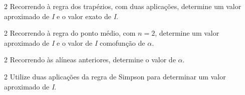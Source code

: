 \documentclass["CN_A-Exercises_Resolutions.tex"]{subfiles}
\begin{document}
\begin{questionBox}2{ %
    Recorrendo à regra dos trapézios, com duas aplicações, determine um valor aproximado de \textit{I} e o valor exato de \textit{I}.
  } %
\end{questionBox}
\begin{questionBox}2{ %
    Recorrendo à regra do ponto médio, com \(n = 2\), determine um valor aproximado de \textit{I} e o valor de \textit{I} comofunção de \(\alpha\).
  } %
\end{questionBox}
\begin{questionBox}2{ %
    Recorrendo às alíneas anteriores, determine o valor de \(\alpha\).
  } %
\end{questionBox}
\begin{questionBox}2{ %
    Utilize duas aplicações da regra de Simpson para determinar um valor aproximado de \textit{I}.
  } %
\end{questionBox}

\setcounter{question}{12}
\end{document}

